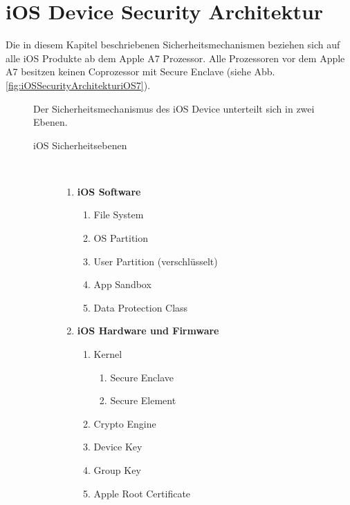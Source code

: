 \pagebreak
\section{iOS Device Security Architektur}
\label{sec:iOSSecArchitektur}

Die in diesem Kapitel beschriebenen Sicherheitsmechanismen beziehen sich auf alle iOS Produkte ab dem Apple A7 Prozessor. Alle Prozessoren vor dem Apple A7 besitzen keinen Coprozessor mit Secure Enclave (siehe Abb. \ref{fig:iOSSecurityArchitekturiOS7}).\par

\begin{figure}[htb]
  \begin{minipage}{0.6\textwidth} 
  Der Sicherheitsmechanismus des iOS Device unterteilt sich in zwei Ebenen. 
  		\begin{description}
   			\item[ iOS Sicherheitsebenen]~\par
         		\begin{enumerate}	
				\item  \textbf{iOS Software}
					\begin{enumerate}
       						\item File System
         					\item OS Partition
						\item User Partition (verschlüsselt)
						\item App Sandbox
						\item Data Protection Class
      					\end{enumerate}
      				\item  \textbf{iOS Hardware und Firmware}~\par
					\begin{enumerate}
       						\item Kernel
						\begin{enumerate}
						\item Secure Enclave
						\item Secure Element
         					\end{enumerate}	
						\item Crypto Engine
						\item Device Key
						\item Group Key
						\item Apple Root Certificate
      					\end{enumerate}
			\end{enumerate}

\end{description}
\end{minipage}
\end{figure}
